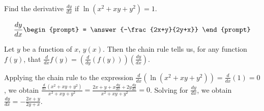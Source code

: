\documentclass{ximera}
\author{Gregory Hartman \and Matthew Carr}
\begin{document}
\begin{exercise}




Find the derivative $\frac{dy}{dx}$ if $\ln(x^2+xy+y^2)=1$.

\[
\frac{dy}{dx}
\begin{prompt}
= \answer{-\frac{2x+y}{2y+x}}
\end{prompt}
\]

\begin{hint}
Let $y$ be a function of $x$, $y(x)$. Then the chain rule tells us, for any function $f(y)$, that $\frac{d}{dx}f(y)=\left(\frac{d}{dy}\left(f(y)\right)\right)\left(\frac{dy}{dx}\right)$. 
\end{hint}

\begin{hint}
Applying the chain rule to the expression $\frac{d}{dx}(\ln(x^2+xy+y^2))=\frac{d}{dx}(1)=0$, we obtain $\frac{\frac{d}{dx}(x^2+xy+y^2)}{x^2+xy+y^2}=\frac{2x+y+x\frac{dy}{dx}+2y\frac{dy}{dx}}{x^2+xy+y^2}=0$. Solving for $\frac{dy}{dx}$, we obtain $\frac{dy}{dx}=-\frac{2x+y}{2y+x}$.
\end{hint}

\end{exercise}
\end{document}
